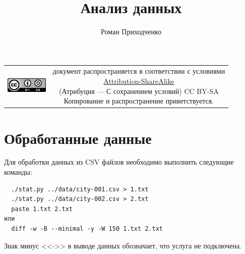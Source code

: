 \documentclass[unicode, 12pt, a4paper,oneside,fleqn]{article}
\author{Роман Приходченко}
\title{Анализ данных}
\begin{document}
\renewcommand\bibname{СПИСОК ЛИТЕРАТУРЫ}
\renewcommand\refname{\centering Список литературы}
\renewcommand\contentsname{\centering Содержание}



\makeatletter %
\maketitle

\begin{table}[ht]
  \begin{tabular}{cc}
    \includegraphics[width=2cm]{../CC_BY-SA_88x31.png} &
    \shortstack{документ распространяется в соответствии с
      условиями\\
      \href{http://creativecommons.org/licenses/by-sa/3.0/}{Attribution-ShareAlike} \\
      (Атрибуция — С сохранением условий) CC BY-SA \\
      Копирование и распространение приветствуется.}
  \end{tabular}
\end{table}

\newpage
\tableofcontents

\newpage

\section{Обработанные данные}
Для обработки данных из CSV файлов необходимо выполнить следующие
команды:
\begin{Verbatim}
  ./stat.py ../data/city-001.csv > 1.txt
  ./stat.py ../data/city-002.csv > 2.txt
  paste 1.txt 2.txt
или
  diff -w -B --minimal -y -W 150 1.txt 2.txt
\end{Verbatim}
Знак минус <<->> в выводе данных обозначает, что услуга не подключена.
\end{document}
